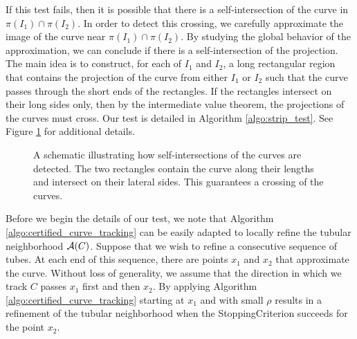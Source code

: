 If this test fails, then it is possible that there is a self-intersection of the curve in $\pi(I_1)\cap\pi(I_2)$.  In order to detect this crossing, we carefully approximate the image of the curve near $\pi(I_1)\cap\pi(I_2)$.  By studying the global behavior of the approximation, we can conclude if there is a self-intersection of the projection.  The main idea is to construct, for each of $I_1$ and $I_2$, a long rectangular region that contains the projection of the curve from either $I_1$ or $I_2$ such that the curve passes through the short ends of the rectangles.  If the rectangles intersect on their long sides only, then by the intermediate value theorem, the projections of the curves must cross.  Our test is detailed in Algorithm \ref{algo:strip_test}.  See Figure \ref{fig:crossing_rectangles} for additional details.


\begin{figure}[h]
    \centering
    
    \caption{A schematic illustrating how self-intersections of the curves are detected.  The two rectangles contain the curve along their lengths and intersect on their lateral sides.  This guarantees a crossing of the curves.}
    \label{fig:crossing_rectangles}
\end{figure}

Before we begin the details of our test, we note that Algorithm \ref{algo:certified_curve_tracking} can be easily adapted to locally refine the tubular neighborhood ${\mathcal A}(C)$.  Suppose that we wish to refine a consecutive sequence of tubes.  At each end of this sequence, there are points $x_1$ and $x_2$ that approximate the curve.  Without loss of generality, we assume that the direction in which we track $C$ passes $x_1$ first and then $x_2$.  By applying Algorithm \ref{algo:certified_curve_tracking} starting at $x_1$ and with small $\rho$ results in a refinement of the tubular neighborhood when the StoppingCriterion succeeds for the point $x_2$.












 

